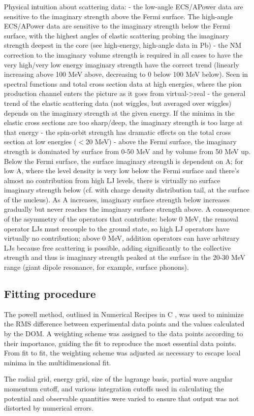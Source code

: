 Physical intuition about scattering data:
- the low-angle ECS/APower data are sensitive to the imaginary strength above
the Fermi surface. The high-angle ECS/APower data are sensitive to the imaginary
strength below the Fermi surface, with the highest angles of elastic scattering
probing the imaginary strength deepest in the core (see high-energy, high-angle
data in Pb)
- the NM correction to the imaginary volume strength is required in all cases to
have the very high/very low energy imaginary strength have the correct trend
(linearly increasing above 100 MeV above, decreasing to 0 below 100 MeV below).
Seen in spectral functions and total cross section data at high energies, where
the pion production channel enters the picture as it goes from virtual->real
- the general trend of the elastic scattering data (not wiggles, but averaged
over wiggles) depends on the imaginary strength at the given energy. If the
minima in the elastic cross sections are too sharp/deep, the imaginary strength
is too large at that energy
- the spin-orbit strength has dramatic effects on the total cross section at low
energies ($<$20 MeV)
- above the Fermi surface, the imaginary strength is dominated by surface from
0-50 MeV and by volume from 50 MeV up. Below the Fermi surface, the surface
imaginary strength is dependent on A; for low A, where the level density is very
low below the Fermi surface and there's almost no contribution from high LJ
levels, there is virtually no surface imaginary strength below (cf. with charge
density distribution tail, at the surface of the nucleus). As A increases, 
imaginary surface strength below increases gradually but never reaches the
imaginary surface strength above. A consequence of the asymmetry of the
operators that contribute: below 0 MeV, the removal operator LJs
must recouple to the ground state, so high LJ operators have virtually no
contribution; above 0 MeV, addition operators can have arbitrary LJs because
free scattering is possible, adding significantly to the collective strength and
thus is imaginary strength peaked at the surface in the 20-30 MeV range (giant
dipole resonance, for example, surface phonons).

\subsection{Fitting procedure}
The powell method, outlined in Numerical Recipes in C \cite{NumericalRecipes},
was used to minimize the RMS difference between experimental data points and the
values calculated by the DOM. A weighting scheme was assigned to the data points
according to their importance, guiding the fit to reproduce the most essential
data points. From fit to fit, the weighting scheme was adjusted as necessary to
escape local minima in the multidimensional fit.

The radial grid, energy grid, size of the lagrange basis, partial wave angular momentum cutoff, and
various integration cutoffs used in calculating the potential and
observable quantities were varied to ensure that output was not distorted by numerical errors. 

\afterpage{\clearpage}
